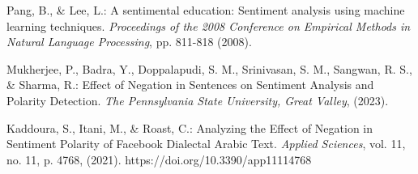 \documentclass[runningheads]{llncs}
\begin{document}
\newpage
\begin{thebibliography}{8}
Pang, B., \& Lee, L.: A sentimental education: Sentiment analysis using machine learning techniques. \textit{Proceedings of the 2008 Conference on Empirical Methods in Natural Language Processing}, pp. 811-818 (2008).

Mukherjee, P., Badra, Y., Doppalapudi, S. M., Srinivasan, S. M., Sangwan, R. S., \& Sharma, R.: Effect of Negation in Sentences on Sentiment Analysis and Polarity Detection. \textit{The Pennsylvania State University, Great Valley}, (2023).

Kaddoura, S., Itani, M., \& Roast, C.: Analyzing the Effect of Negation in Sentiment Polarity of Facebook Dialectal Arabic Text. \textit{Applied Sciences}, vol. 11, no. 11, p. 4768, (2021). https://doi.org/10.3390/app11114768
\end{thebibliography}
\end{document}
